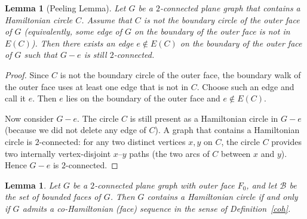 \documentclass[12pt]{amsart}
\theoremstyle{theorem}%
\newtheorem{lemma}[theorem]{Lemma}
\theoremstyle{definition}%
\begin{document}
\begin{lemma}[Peeling Lemma]\label{lem:peeling}
Let $G$ be a $2$-connected plane graph that contains a Hamiltonian circle $C$.
Assume that $C$ is \emph{not} the boundary circle of the outer face of $G$
(equivalently, some edge of $G$ on the boundary of the outer face is not in $E(C)$).
Then there exists an edge $e\notin E(C)$ on the boundary of the outer face of $G$
such that $G-e$ is still $2$-connected.
\end{lemma}

\begin{proof}
Since $C$ is not the boundary circle of the outer face, the boundary walk of the outer face uses at least one edge
that is not in $C$. Choose such an edge and call it $e$. Then $e$ lies on the boundary of the outer face and
$e\notin E(C)$.

Now consider $G-e$. The circle $C$ is still present as a Hamiltonian circle in $G-e$ (because we did not delete any edge of $C$).
A graph that contains a Hamiltonian circle is $2$-connected: for any two distinct vertices $x,y$ on $C$,
the circle $C$ provides two internally vertex-disjoint $x$--$y$ paths (the two arcs of $C$ between $x$ and $y$).
Hence $G-e$ is $2$-connected.
\end{proof}



\begin{lemma}\label{thm:ham-iff-coham-seq}
Let $G$ be a $2$-connected plane graph with outer face $F_0$, and let $\mathcal{B}$ be the set of bounded faces of $G$.
Then $G$ contains a Hamiltonian circle if and only if $G$ admits a co-Hamiltonian (face) sequence
in the sense of Definition~\ref{coh}.
\end{lemma}
\end{document}
